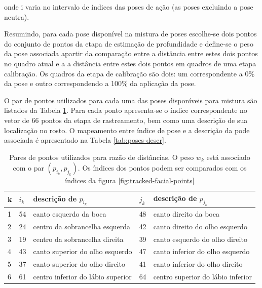 onde i varia no intervalo de índices das poses de ação (as poses excluindo a pose neutra).

Resumindo, para cada pose disponível na mistura de poses escolhe-se dois pontos do conjunto de pontos da etapa de estimação de profundidade e define-se o peso da pose associada apartir da comparação entre a  distância entre estes dois pontos no quadro atual e a a distância entre estes dois pontos em quadros de uma etapa calibração. Os quadros da etapa de calibração são dois: um correspondente a 0\% da pose e outro correspondendo a 100\% da aplicação da pose.

O par de pontos utilizados para cada uma das poses disponíveis para mistura são listados da Tabela \ref{tab:sensors}. Para cada ponto apresenta-se o índice correspondente no vetor de 66 pontos da etapa de rastreamento, bem como uma descrição de sua localização no rosto. O mapeamento entre índice de pose e a descrição da pode associada é apresentado na Tabela \ref{tab:poses-descr}. 

\begin{table}[!htb]
\centering
\begin{tabular}{|l|l|l|l|l|}
\hline
k &  $i_k$ & descrição de $p_{i_k}$ & $j_k$ & descrição de $p_{j_k}$ \\ \hline
1 &  54 & canto esquerdo da boca & 48  & canto direito da boca \\ \hline
2 & 24 & centro da sobrancelha esquerda & 42 & canto direito do olho esquerdo \\ \hline
3 & 19 & centro da sobrancelha direita & 39 & canto esquerdo do olho direito \\ 	\hline
4 &  43 & canto superior do olho esquerdo & 47 & canto inferior do olho esquerdo \\ \hline
5 &  37 & canto superior do olho direito & 41 & canto inferior do olho direito \\ \hline
6 &  61 & centro inferior do lábio superior& 64 & centro superior do lábio inferior \\ \hline
\end{tabular}
\caption{Pares de pontos utilizados para razão de distâncias. O peso $w_k$ está associado com o par $(p_{i_k},p_{j_k})$. Os índices dos pontos podem ser comparados com os índices da figura \ref{fig:tracked-facial-points}}
\label{tab:sensors}
\end{table}

